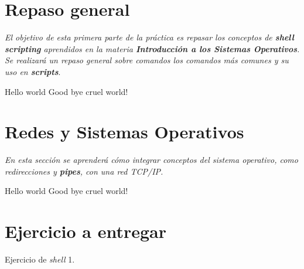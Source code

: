 \section{Repaso general}

\textit{El objetivo de esta primera parte de la práctica es repasar los
  conceptos de \textbf{shell scripting} aprendidos en la materia
  \textbf{Introducción a los Sistemas Operativos}. Se realizará un repaso
  general sobre comandos los comandos más comunes y su uso en
  \textbf{scripts}}.

\begin{questions}
\question Hello world
\question Good bye cruel world!
\end{questions}

\section{Redes y Sistemas Operativos}

\textit{En esta sección se aprenderá cómo integrar conceptos del sistema
  operativo, como redirecciones y \textbf{pipes}, con una red TCP/IP.}

\begin{questions}
\question Hello world
\question Good bye cruel world!
\end{questions}

\section{Ejercicio a entregar}

Ejercicio de \textit{shell} 1.
